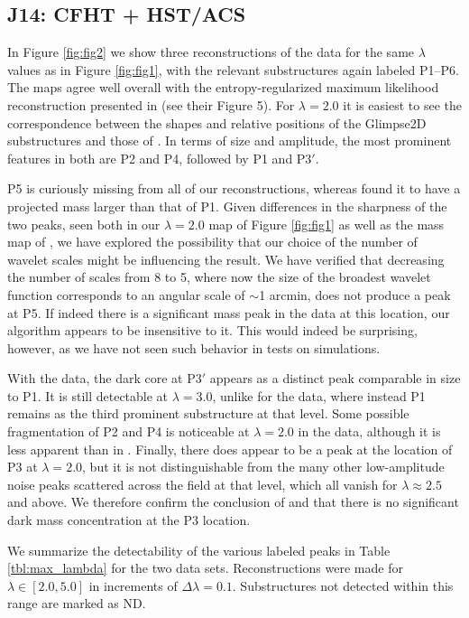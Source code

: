 \documentclass[iop,twocolappendix]{emulateapj}
\newcommand{\cta}[1]{\citetalias{#1}}
\begin{document}
\subsection{J14: CFHT + HST/ACS}
In Figure \ref{fig:fig2} we show three reconstructions of the \cta{J14} data for the same $\lambda$
values as in Figure \ref{fig:fig1}, with the relevant substructures again labeled P1--P6. The maps
agree well overall with the entropy-regularized maximum likelihood reconstruction presented in
\cta{J14} (see their Figure 5). For $\lambda=2.0$ it is easiest to see the correspondence between
the shapes and relative positions of the Glimpse2D substructures and those of \cta{J14}. In terms 
of size and amplitude, the most prominent features in both are P2 and P4, followed by P1 and 
P$3'$. 

P5 is curiously missing from all of our reconstructions, whereas \cta{J14} found it to 
have a projected mass larger than that of P1. Given differences in the sharpness of the two peaks, 
seen both in our $\lambda=2.0$ map of Figure \ref{fig:fig1} as well as the mass map of \cta{J14}, 
we have explored the possibility that our choice of the number of wavelet scales might be
influencing the result.
We have verified that decreasing the number of scales from 8 to 5, where now the size of the 
broadest wavelet function corresponds to an angular scale of $\sim$1 arcmin, does not produce a peak at P5.
If indeed there is a significant mass peak in the data at this location, our algorithm appears 
to be insensitive to it. This would indeed be surprising, however, as we have not seen such 
behavior in tests on simulations.

With the \cta{J14} data, the dark core at P$3'$ appears as a distinct peak comparable in size to
P1. It is still detectable at $\lambda=3.0$, unlike for the \cta{C12} data, where instead P1 remains
as the third prominent substructure at that level. Some possible fragmentation of P2 and P4 is 
noticeable at $\lambda=2.0$ in the \cta{J14} data, although it is less apparent than in \cta{C12}.
Finally, there does appear to be a peak at the location of P3 at $\lambda=2.0$, but it is not 
distinguishable from the many other low-amplitude noise peaks scattered across the field at that
level, which all vanish for $\lambda\approx 2.5$ and above. We therefore confirm the conclusion of \cta{C12}
and \cta{J14} that there is no significant dark mass concentration at the P3 location.

We summarize the detectability of the various labeled peaks in Table \ref{tbl:max_lambda} for the two
data sets. Reconstructions were made for $\lambda\in[2.0, 5.0]$ in increments of $\Delta\lambda=0.1$.
Substructures not detected within this range are marked as ND.
\end{document}
